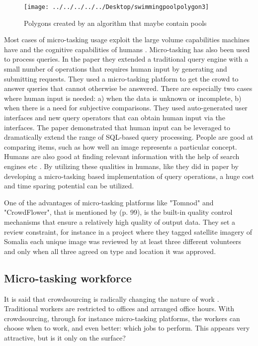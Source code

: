 \begin{figure}[H]
	\centering
	\texttt{[image: ../../../../../Desktop/swimmingpoolpolygon3]}
	\caption[Swimming pools  \citep{Nikki2016}]{Polygons created by an algorithm that maybe contain pools \citep{Nikki2016}}
	\label{fig:swimmingpoolpolygon3}
\end{figure}

Most cases of micro-tasking usage exploit the large volume capabilities machines have and the cognitive capabilities of humans \citep{Difallah2016}. Micro-tasking has also been used to process queries. In the \cite{Franklin2011} paper they extended a traditional query engine with a small number of operations that requires human input by generating and submitting requests.  They used a micro-tasking platform to get the crowd to answer queries that cannot otherwise be answered. There are especially two cases where human input is needed: a) when the data is unknown or incomplete, b) when there is a need for subjective comparisons. They used auto-generated user interfaces and new query operators that can obtain human input via the interfaces. The \cite{Franklin2011} paper demonstrated that human input can be leveraged to dramatically extend the range of SQL-based query processing. People are good at comparing items, such as how well an image represents a particular concept. Humans are also good at finding relevant information with the help of search engines etc \citep{Franklin2011}. By utilizing these qualities in humans, like they did in \citep{Franklin2011} paper by developing a micro-tasking based implementation of query operations, a huge cost and time sparing potential can be utilized. 

One of the advantages of micro-tasking platforms like "Tomnod" and "CrowdFlower", that is mentioned by \cite{Meier2013} (p. 99), is the built-in quality control mechanisms that ensure a relatively high quality of output data. They set a review constraint, for instance in a project where they tagged satellite imagery of Somalia each unique image was reviewed by at least three different volunteers and only when all three agreed on type and location it was approved. 

\subsection{Micro-tasking workforce}
It is said that crowdsourcing is radically changing the nature of work \cite{Deng2016a}. Traditional workers are restricted to offices and arranged office hours. With crowdsourcing, through for instance micro-tasking platforms, the workers can choose when to work, and even better: which jobs to perform. This appears very attractive, but is it only on the surface? 

